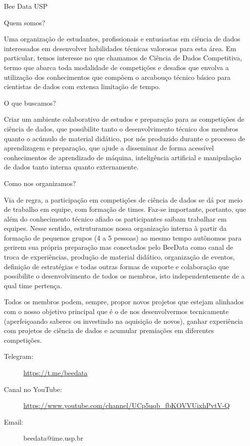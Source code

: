 \begin{subsecao}{Bee Data USP}


Quem somos?

Uma organização de estudantes, profissionais e entusiastas em ciência
de dados interessados em desenvolver habilidades técnicas valorosas para
esta área. Em particular, temos interesse no que chamamos de Ciência de
Dados Competitiva, termo que abarca toda modalidade de competições e desafios
que envolva a utilização dos conhecimentos que compõem o arcabouço técnico
básico para cientistas de dados com extensa limitação de tempo.

O que buscamos?

Criar um ambiente colaborativo de estudos e preparação para as competições de
ciência de dados, que possibilite tanto o desenvolvimento técnico dos membros
quanto o acúmulo de material didático, por nós produzido durante o processo de
aprendizagem e preparação, que ajude a disseminar de forma acessível conhecimentos
de aprendizado de máquina, inteligência artificial e manipulação de dados tanto
interna quanto externamente.

Como nos organizamos?

Via de regra, a participação em competições de ciência de dados se dá por meio
de trabalho em equipe, com formação de times. Faz-se importante, portanto, que
além do conhecimento técnico afiado os participantes saibam trabalhar em equipes.
Nesse sentido, estruturamos nossa organização interna à partir da formação de
pequenos grupos (4 a 5 pessoas) ao mesmo tempo autônomos para gerirem sua própria
preparação mas conectados pelo BeeData como canal de troca de experiências, produção
de material didático, organização de eventos, definição de estratégias e todas outras
formas de suporte e colaboração que possibilite o desenvolvimento de todos os membros,
isto independentemente de a qual time pertença.

Todos os membros podem, sempre, propor novos projetos que estejam alinhados com
o nosso objetivo principal que é o de nos desenvolvermos tecnicamente (aperfeiçoando
saberes ou investindo na aquisição de novos), ganhar experiência com projetos de
ciência de dados e acumular premiações em diferentes competições.

\begin{description}
  \item[Telegram:] \url{https://t.me/beedata}
  \item[Canal no YouTube:] \url{https://www.youtube.com/channel/UCp5uqb_fbKOVVUixhPvtV-Q}
  \item[Email:] beedata@ime.usp.br
\end{description}

\end{subsecao}
